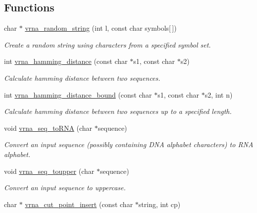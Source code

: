 \subsection*{Functions}
\begin{DoxyCompactItemize}
\item 
char $\ast$ \hyperlink{group__string__utils_ga4eeb3750dcf860b9f3158249f95dbd7f}{vrna\+\_\+random\+\_\+string} (int l, const char symbols\mbox{[}$\,$\mbox{]})
\begin{DoxyCompactList}\small\item\em Create a random string using characters from a specified symbol set. \end{DoxyCompactList}\item 
int \hyperlink{group__string__utils_ga301798b43b6f66687985c725efd14f32}{vrna\+\_\+hamming\+\_\+distance} (const char $\ast$s1, const char $\ast$s2)
\begin{DoxyCompactList}\small\item\em Calculate hamming distance between two sequences. \end{DoxyCompactList}\item 
int \hyperlink{group__string__utils_ga5d1c2271e79d9bcb52d4e68360763fb9}{vrna\+\_\+hamming\+\_\+distance\+\_\+bound} (const char $\ast$s1, const char $\ast$s2, int n)
\begin{DoxyCompactList}\small\item\em Calculate hamming distance between two sequences up to a specified length. \end{DoxyCompactList}\item 
void \hyperlink{group__string__utils_gacfed92cba77064f6c743f9118d079bfc}{vrna\+\_\+seq\+\_\+to\+R\+N\+A} (char $\ast$sequence)
\begin{DoxyCompactList}\small\item\em Convert an input sequence (possibly containing D\+N\+A alphabet characters) to R\+N\+A alphabet. \end{DoxyCompactList}\item 
void \hyperlink{group__string__utils_ga4f44dca03c9d708d68e64c0610bb9091}{vrna\+\_\+seq\+\_\+toupper} (char $\ast$sequence)
\begin{DoxyCompactList}\small\item\em Convert an input sequence to uppercase. \end{DoxyCompactList}\item 
char $\ast$ \hyperlink{group__string__utils_ga74f05ece32ea73b59f84a7452afd5fae}{vrna\+\_\+cut\+\_\+point\+\_\+insert} (const char $\ast$string, int cp)

\end{DoxyCompactItemize}
